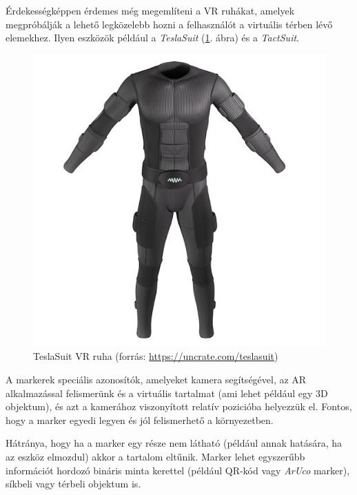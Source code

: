 Érdekességképpen érdemes még megemlíteni a VR ruhákat, amelyek megpróbálják a lehető legközelebb hozni a felhasználót a virtuális térben lévő elemekhez.
Ilyen eszközök például a \textit{TeslaSuit} (\ref{fig:teslasuit}. ábra) és a \textit{TactSuit}.

\begin{figure}[htp]
    \centering
   	\includegraphics[scale=0.3]{images/tesla.jpg}
	\caption{TeslaSuit VR ruha (forrás: \url{https://uncrate.com/teslasuit})}
	\label{fig:teslasuit}
\end{figure}



A markerek speciális azonosítók, amelyeket kamera segítségével, az AR alkalmazással felismerünk és a virtuális tartalmat (ami lehet például egy 3D objektum), és azt a kamerához viszonyított relatív pozicióba helyezzük el. 
Fontos, hogy a marker egyedi legyen és jól felismerhető a környezetben. 

Hátránya, hogy ha a marker egy része nem látható (például annak hatására, ha az eszköz elmozdul) akkor a tartalom eltűnik.
Marker lehet egyszerűbb információt hordozó bináris minta kerettel (például QR-kód vagy \textit{ArUco} marker), síkbeli vagy térbeli objektum is.

